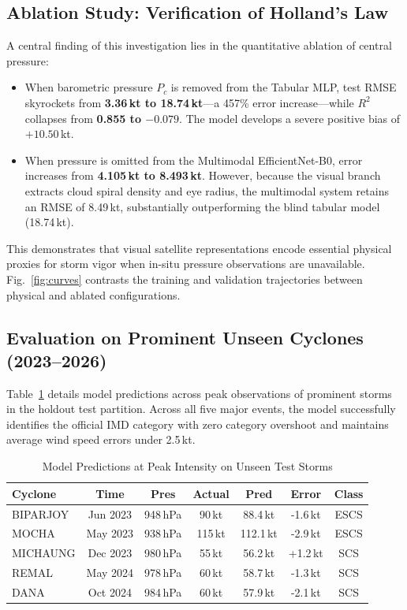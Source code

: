 \documentclass[conference]{IEEEtran}
\begin{document}
\subsection{Ablation Study: Verification of Holland’s Law}
A central finding of this investigation lies in the quantitative ablation of central pressure:
\begin{itemize}
    \item When barometric pressure $P_c$ is removed from the Tabular MLP, test RMSE skyrockets from \textbf{3.36\,kt to 18.74\,kt}—a 457\% error increase—while $R^2$ collapses from \textbf{0.855 to $-0.079$}. The model develops a severe positive bias of $+10.50$\,kt.
    \item When pressure is omitted from the Multimodal EfficientNet-B0, error increases from \textbf{4.105\,kt to 8.493\,kt}. However, because the visual branch extracts cloud spiral density and eye radius, the multimodal system retains an RMSE of 8.49\,kt, substantially outperforming the blind tabular model (18.74\,kt).
\end{itemize}
This demonstrates that visual satellite representations encode essential physical proxies for storm vigor when in-situ pressure observations are unavailable. Fig.~\ref{fig:curves} contrasts the training and validation trajectories between physical and ablated configurations.

\subsection{Evaluation on Prominent Unseen Cyclones (2023--2026)}
Table~\ref{tab:individual_storms} details model predictions across peak observations of prominent storms in the holdout test partition. Across all five major events, the model successfully identifies the official IMD category with zero category overshoot and maintains average wind speed errors under 2.5\,kt.

\begin{table}[!t]
\caption{Model Predictions at Peak Intensity on Unseen Test Storms}
\label{tab:individual_storms}
\centering
\footnotesize
\begin{tabular}{lcccccc}
\toprule
\textbf{Cyclone} & \textbf{Time} & \textbf{Pres} & \textbf{Actual} & \textbf{Pred} & \textbf{Error} & \textbf{Class} \\
\midrule
BIPARJOY & Jun 2023 & 948\,hPa & 90\,kt & 88.4\,kt & -1.6\,kt & ESCS \\
MOCHA & May 2023 & 938\,hPa & 115\,kt & 112.1\,kt & -2.9\,kt & ESCS \\
MICHAUNG & Dec 2023 & 980\,hPa & 55\,kt & 56.2\,kt & +1.2\,kt & SCS \\
REMAL & May 2024 & 978\,hPa & 60\,kt & 58.7\,kt & -1.3\,kt & SCS \\
DANA & Oct 2024 & 984\,hPa & 60\,kt & 57.9\,kt & -2.1\,kt & SCS \\
\bottomrule
\end{tabular}
\end{table}
\end{document}
